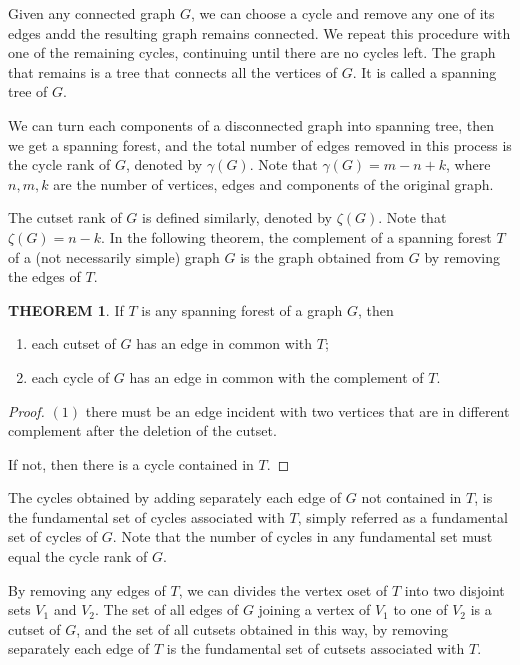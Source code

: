 \documentclass[a4paper,11pt]{article}%
\theoremstyle{remark}
\theoremstyle{definition}
\newtheorem{theorem}{THEOREM}[section]
\theoremstyle{definition}
\theoremstyle{definition}
\theoremstyle{definition}
\theoremstyle{plain}
\theoremstyle{definition}
\begin{document}
Given any connected graph $G$, we can choose a cycle and remove any one of its edges
andd the resulting graph remains connected. We repeat this procedure with one of 
the remaining cycles, continuing until there are no cycles left. The graph that remains 
is a tree that connects all the vertices of $G$. It is called a spanning tree of $G$.

We can turn each components of a disconnected graph into spanning tree, then we get a 
spanning forest, and the total number of edges removed in this process 
is the cycle rank of $G$, denoted by $\gamma(G)$.
Note that $\gamma(G)=m-n+k$, where $n,m,k$ are the number of vertices, edges and components
of the original graph.

The cutset rank of $G$ is defined similarly, denoted by $\zeta (G)$. Note that $\zeta(G)=n-k$.
In the following theorem, the complement of a spanning forest $T$ of a (not necessarily simple)
graph $G$ is the graph obtained from $G$ by removing the edges of $T$.
\begin{theorem}
    If $T$ is any spanning forest of a graph $G$, then 
    \begin{enumerate}
        \item each cutset of $G$ has an edge in common with $T$;
        \item each cycle of $G$ has an edge in common with the complement of $T$.
    \end{enumerate}
\end{theorem} 
\begin{proof}
    $(1)$ there must be an edge incident with two vertices that are in different complement
    after the deletion of the cutset.

    If not, then there is a cycle contained in $T$.
\end{proof}
The cycles obtained by adding separately each edge of $G$ not contained 
in $T$, is the fundamental set of cycles associated with $T$, simply referred as 
a fundamental set of cycles of $G$. Note that the number of cycles in any fundamental 
set must equal the cycle rank of $G$.

By removing any edges of $T$, we can divides the vertex oset of $T$ into two disjoint
sets $V_1$ and $V_2$. The set of all edges of $G$ joining a vertex of $V_1$
to one of $V_2$ is a cutset of $G$, and the set of all cutsets obtained 
in this way, by removing separately each edge of $T$ is the fundamental set of cutsets 
associated with $T$.
\end{document}

